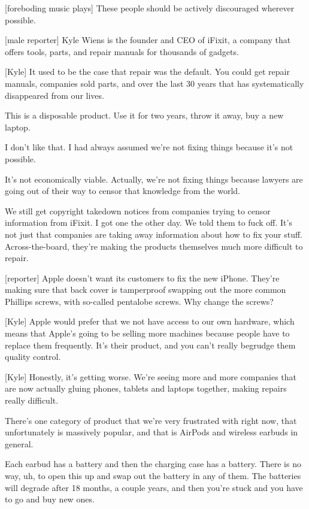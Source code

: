 \documentclass[a4paper]{article}
\begin{document}
	
	
	[foreboding music plays]
	These people should be actively discouraged wherever possible.
	
	
	[male reporter] Kyle Wiens is the founder and CEO of iFixit, a company that offers tools, parts, and repair manuals for thousands of gadgets.
	
	
	[Kyle] It used to be the case that repair was the default.
	You could get repair manuals, companies sold parts, and over the last 30 years that has systematically disappeared from our lives.
	
	
	This is a disposable product.
	Use it for two years, throw it away, buy a new laptop.
	
	
	I don't like that.
	I had always assumed we're not fixing things because it's not possible.
	
	
	It's not economically viable.
	Actually, we're not fixing things because lawyers are going out of their way to censor that knowledge from the world.
	
	
	We still get copyright takedown notices from companies trying to censor information from iFixit.
	I got one the other day.
	We told them to fuck off.
	It's not just that companies are taking away information about how to fix your stuff.
	Across-the-board, they're making the products themselves much more difficult to repair.
	
	
	
	[reporter] Apple doesn't want its customers to fix the new iPhone.
	They're making sure that back cover is tamperproof swapping out the more common Phillips screws, with so-called pentalobe screws.
	Why change the screws?
	
	
	[Kyle] Apple would prefer that we not have access to our own hardware, which means that Apple's going to be selling more machines because people have to replace them frequently. It's their product, and you can't really begrudge them quality control.
	
	
	[Kyle] Honestly, it's getting worse. We're seeing more and more companies that are now actually gluing phones, tablets and laptops together, making repairs really difficult.
	
	
	There's one category of product that we're very frustrated with right now, that unfortunately is massively popular, and that is AirPods and wireless earbuds in general.
	
	
	Each earbud has a battery and then the charging case has a battery.
	There is no way, uh, to open this up and swap out the battery in any of them.
	The batteries will degrade after 18 months, a couple years, and then you're stuck and you have to go and buy new ones.
	
\end{document}
